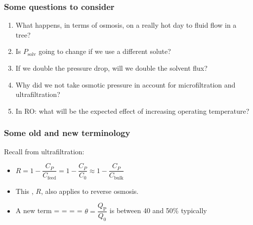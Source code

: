 \begin{frame}\frametitle{Some questions to consider}
	\begin{enumerate}
		\item	What happens, in terms of osmosis, on a really hot day to fluid flow in a tree?
		\item	Is $P_\text{solv}$ going to change if we use a different solute?
		\item	If we double the pressure drop, will we double the solvent flux?
		\item	Why did we not take osmotic pressure in account for microfiltration and ultrafiltration?
		\item	In RO: what will be the expected effect of increasing operating temperature?
	\end{enumerate}
\end{frame}

\begin{frame}\frametitle{Some old and new terminology}
	Recall from ultrafiltration:
	\begin{itemize}
		\item	$R = 1 - \dfrac{C_P}{C_\text{feed}} = 1 - \dfrac{C_P}{C_\text{0}} \approx 1 -  \dfrac{C_P}{C_\text{bulk}}$

		\item	This {\color{purple}{rejection coefficient}}, $R$, also applies to reverse osmosis.

		\item	A new term = {\color{purple}{cut}} = {\color{purple}{conversion}} = {\color{purple}{recovery}} = $\theta = \dfrac{Q_\text{P}}{Q_\text{0}}$ is between 40 and 50\% typically
	\end{itemize}
\end{frame}

